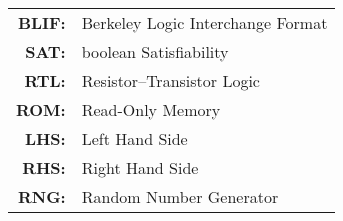 \begin{tabular}{rl}
  \vspace{0.1em} \textbf{BLIF:} & Berkeley Logic Interchange Format\\
  \vspace{0.1em} \textbf{SAT:} &  boolean Satisfiability\\
  \vspace{0.1em} \textbf{RTL:} & Resistor–Transistor Logic\\
  \vspace{0.1em} \textbf{ROM:} & Read-Only Memory\\
  \vspace{0.1em} \textbf{LHS:} & Left Hand Side\\
  \vspace{0.1em} \textbf{RHS:} & Right Hand Side\\
  \vspace{0.1em} \textbf{RNG:} & Random Number Generator\\
  \end{tabular}
